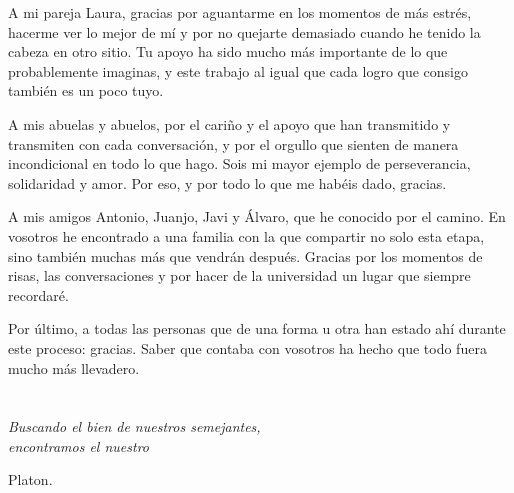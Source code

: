 A mi pareja Laura, gracias por aguantarme en los momentos de más estrés, hacerme ver lo mejor de mí y por no quejarte demasiado cuando he tenido la cabeza en otro sitio. Tu apoyo ha sido mucho más importante de lo que probablemente imaginas, y este trabajo al igual que cada logro que consigo también es un poco tuyo.

A mis abuelas y abuelos, por el cariño y el apoyo que han transmitido y transmiten con cada conversación, y por el orgullo que sienten de manera incondicional en todo lo que hago. Sois mi mayor ejemplo de perseverancia, solidaridad y amor. Por eso, y por todo lo que me habéis dado, gracias.

A mis amigos Antonio, Juanjo, Javi y Álvaro, que he conocido por el camino. En vosotros he encontrado a una familia con la que compartir no solo esta etapa, sino también muchas más que vendrán después. Gracias por los momentos de risas, las conversaciones y por hacer de la universidad un lugar que siempre recordaré.

Por último, a todas las personas que de una forma u otra han estado ahí durante este proceso: gracias. Saber que contaba con vosotros ha hecho que todo fuera mucho más llevadero.

\cleardoublepage %

%


\cleardoublepage %

\chapter*{}

\setlength{\leftmargin}{0.5\textwidth}
\setlength{\parsep}{0cm}
\addtolength{\topsep}{0.5cm}
\begin{flushright}
	\small\em{
		Buscando el bien de nuestros semejantes,\\
		encontramos el nuestro
	}
\end{flushright}

\begin{flushright}
	\small{
		Platon.
	}
\end{flushright}

\cleardoublepage %

